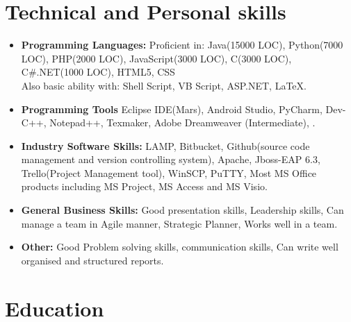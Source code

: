 \documentclass[11pt,a4paper,sans]{moderncv}        %
\begin{document}
\vspace{8pt}

\section{Technical and Personal skills}

\vspace{5pt}

\begin{itemize}

\item \textbf{Programming Languages:} Proficient in: Java(15000 LOC), Python(7000 LOC), PHP(2000 LOC), JavaScript(3000 LOC), C(3000 LOC), C\#.NET(1000 LOC), HTML5, CSS \\ Also basic ability with: Shell Script, VB Script, ASP.NET, LaTeX.

\vspace{8pt}

\item \textbf{Programming Tools} Eclipse IDE(Mars), Android Studio, PyCharm, Dev-C++, Notepad++, Texmaker, Adobe Dreamweaver (Intermediate), .

\vspace{8pt}

\item \textbf{Industry Software Skills:} LAMP, Bitbucket, Github(source code management and version controlling system), Apache, Jboss-EAP 6.3, Trello(Project Management tool), WinSCP, PuTTY, Most MS Office products including MS Project, MS Access and MS Visio.

\vspace{8pt}

\item \textbf{General Business Skills:} Good presentation skills, Leadership skills, Can manage a team in Agile manner, Strategic Planner, Works well in a team.

\vspace{8pt}

\item \textbf{Other:} Good Problem solving skills, communication skills, Can write well organised and structured reports.

\end{itemize}

\newpage

\section{Education}
\end{document}
